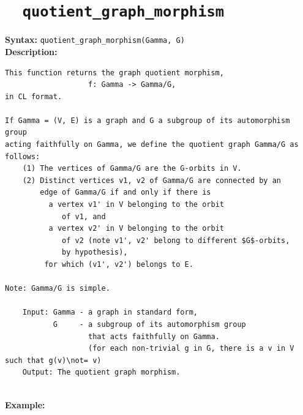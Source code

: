 \documentclass{article}
\begin{document}
\section{\tt \ \ quotient\_graph\_morphism}

\textbf{Syntax:} \verb}quotient_graph_morphism(Gamma, G)}\\

\textbf{Description:}
\begin{verbatim}
This function returns the graph quotient morphism, 
                   f: Gamma -> Gamma/G,
in CL format.

If Gamma = (V, E) is a graph and G a subgroup of its automorphism group 
acting faithfully on Gamma, we define the quotient graph Gamma/G as follows:
    (1) The vertices of Gamma/G are the G-orbits in V. 
    (2) Distinct vertices v1, v2 of Gamma/G are connected by an 
        edge of Gamma/G if and only if there is 
          a vertex v1' in V belonging to the orbit 
             of v1, and 
          a vertex v2' in V belonging to the orbit 
             of v2 (note v1', v2' belong to different $G$-orbits,
             by hypothesis), 
         for which (v1', v2') belongs to E.
    
Note: Gamma/G is simple.
    
    Input: Gamma - a graph in standard form,
           G     - a subgroup of its automorphism group
                   that acts faithfully on Gamma.
                   (for each non-trivial g in G, there is a v in V such that g(v)\not= v)
    Output: The quotient graph morphism.


\end{verbatim}
\textbf{Example:}
\end{document}
